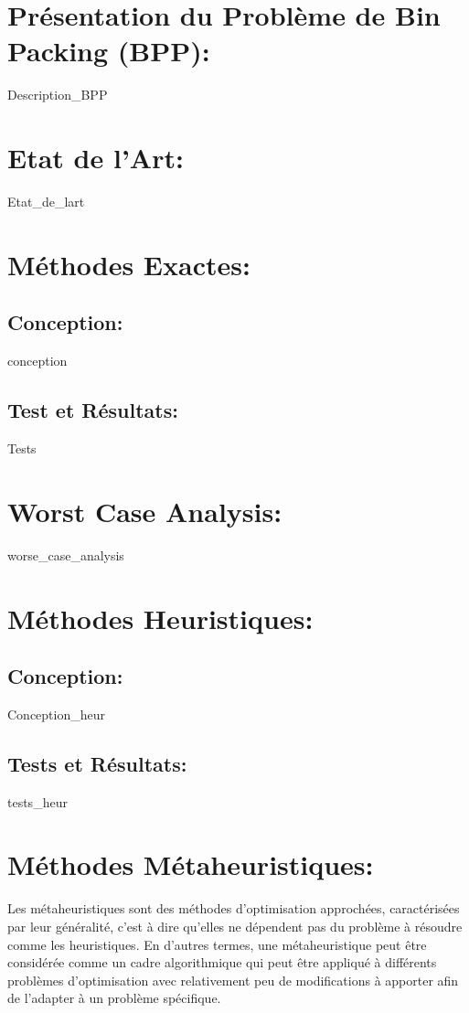 \documentclass[12pt,a4paper, titlepage]{report}
\begin{document}
    \part{Présentation du Problème de Bin Packing (BPP): }
    {Description_BPP}
    \part{Etat de l'Art: }
    {Etat_de_lart}
    \part{Méthodes Exactes: }
    \chapter{Conception: }
    {conception}
    \chapter{Test et Résultats: }
    {Tests}
    \part{Worst Case Analysis: }
    {worse_case_analysis}
    \newpage
    \part{Méthodes Heuristiques: }
    \chapter{Conception: }
    {Conception_heur}
    \chapter{Tests et Résultats: }
    {tests_heur}
    \part{Méthodes Métaheuristiques: }
        Les métaheuristiques sont des méthodes d’optimisation approchées, caractérisées par leur généralité, c’est à dire qu’elles ne dépendent pas du problème à résoudre comme les heuristiques. En d'autres termes, une métaheuristique peut être considérée comme un
    cadre algorithmique qui peut être appliqué à différents problèmes d'optimisation avec relativement peu de modifications à apporter afin de l’adapter à un problème spécifique.
\end{document}
